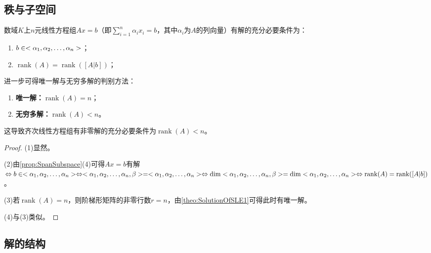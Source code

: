 \subsection{秩与子空间}
\begin{theorem}\label{theo:SolutionOfSLE2}
	数域$K$上$n$元线性方程组$Ax=b$（即$\sum\limits_{i=1}^{n}\alpha_ix_i=b$，其中$\alpha_i$为$A$的列向量）有解的充分必要条件为：
	\begin{enumerate}
		\item $b\in<\alpha_1, \alpha_2, \dots, \alpha_{n}>$；
		\item $\operatorname{rank}(A)=\operatorname{rank}([A|b])$；
	\end{enumerate}
	进一步可得唯一解与无穷多解的判别方法：
	\begin{enumerate}
		\item \textbf{唯一解：}$\operatorname{rank}(A)=n$；
		\item \textbf{无穷多解：}$\operatorname{rank}(A)<n$。
	\end{enumerate}
	这导致齐次线性方程组有非零解的充分必要条件为$\operatorname{rank}(A)<n$。
\end{theorem}
\begin{proof}
	(1)显然。\par
	(2)由\cref{prop:SpanSubspace}(4)可得$Ax=b$有解$\Leftrightarrow b\in<\alpha_1, \alpha_2, \dots, \alpha_{n}>\Leftrightarrow<\alpha_1, \alpha_2, \dots, \alpha_{n},\beta>=<\alpha_1, \alpha_2, \dots, \alpha_{n}>\Leftrightarrow\dim<\alpha_1, \alpha_2, \dots, \alpha_{n},\beta>=\dim<\alpha_1, \alpha_2, \dots, \alpha_{n}>\Leftrightarrow\operatorname{rank}(A)=\operatorname{rank}([A|b])$。\par
	(3)若$\operatorname{rank}(A)=n$，则阶梯形矩阵的非零行数$r=n$，由\cref{theo:SolutionOfSLE1}可得此时有唯一解。\par
	(4)与(3)类似。
\end{proof}
\subsection{解的结构}
